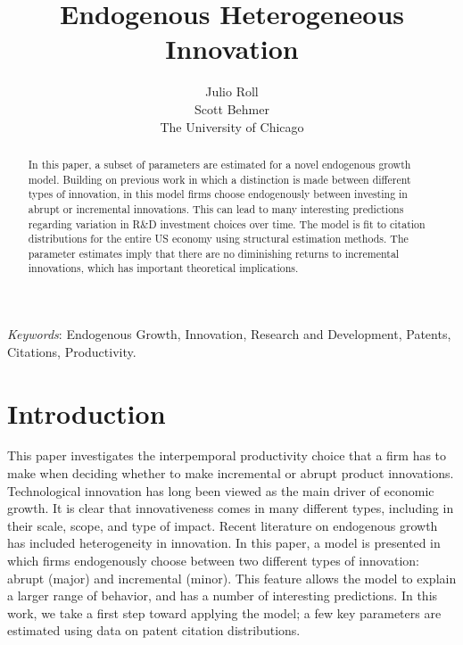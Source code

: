 \documentclass[letterpaper,12pt]{article}
\theoremstyle{definition}
\begin{document}
\title{Endogenous Heterogeneous Innovation}

\author{Julio Roll\\Scott Behmer\\
  The University of Chicago}

\date{}              %


\renewcommand{\thefootnote}{\fnsymbol{footnote}}

\singlespacing

\maketitle

\vspace{-.2in}
\begin{abstract}
\noindent 
In this paper, a subset of parameters are estimated for a novel endogenous growth model. Building on previous work in which a distinction is made between different types of innovation, in this model firms choose endogenously between investing in abrupt or incremental innovations. This can lead to many interesting predictions regarding variation in R\&D investment choices over time. The model is fit to citation distributions for the entire US economy using structural estimation methods. The parameter estimates imply that there are no diminishing returns to incremental innovations, which has important theoretical implications.
\end{abstract}

\medskip
\noindent \textit{Keywords}: Endogenous Growth, Innovation, Research and Development, Patents, Citations, Productivity.

\thispagestyle{empty}

\onehalfspacing
\setcounter{footnote}{1}
\renewcommand{\thefootnote}{\arabic{footnote}}
\setcounter{page}{1}

\section{Introduction}

This paper investigates the interpemporal productivity choice that a firm has to make when deciding whether to make incremental or abrupt product innovations. Technological innovation has long been viewed as the main driver of economic growth. It is clear that innovativeness comes in many different types, including in their scale, scope, and type of impact. Recent literature on endogenous growth has included heterogeneity in innovation. In this paper, a model is presented in which firms endogenously choose between two different types of innovation: abrupt (major) and incremental (minor). This feature allows the model to explain a larger range of behavior, and has a number of interesting predictions. In this work, we take a first step toward applying the model; a few key parameters are estimated using data on patent citation distributions.
\end{document}
